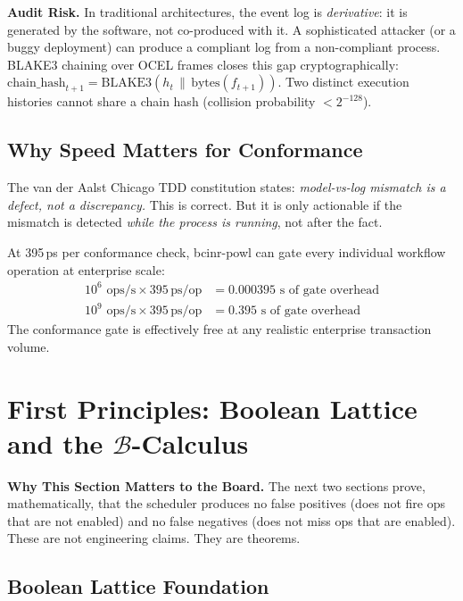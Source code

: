 \documentclass[12pt,a4paper]{article}
\theoremstyle{definition}
\theoremstyle{remark}
\newcommand{\execinsight}[2]{%
  \begin{execbox}
    \textbf{\color{chatblue}#1}\quad #2
  \end{execbox}}
\newcommand{\auditinsight}[2]{%
  \begin{auditbox}
    \textbf{\color{warnorange}#1}\quad #2
  \end{auditbox}}
\begin{document}
\auditinsight{Audit Risk.}{%
In traditional architectures, the event log is \emph{derivative}: it is generated
by the software, not co-produced with it.
A sophisticated attacker (or a buggy deployment) can produce a compliant log
from a non-compliant process.
BLAKE3 chaining over OCEL frames closes this gap cryptographically:
$\mathrm{chain\_hash}_{t+1} = \mathrm{BLAKE3}(h_t \,\|\, \mathrm{bytes}(f_{t+1}))$.
Two distinct execution histories cannot share a chain hash (collision probability $<2^{-128}$).}

\subsection{Why Speed Matters for Conformance}

The van der Aalst Chicago TDD constitution \citep{vanderjest2024chicago} states:
\emph{model-vs-log mismatch is a defect, not a discrepancy.}
This is correct.
But it is only actionable if the mismatch is detected \emph{while the process is running},
not after the fact.

At 395\,ps per conformance check, bcinr-powl can gate every individual workflow operation
at enterprise scale:
\begin{align*}
  10^6 \text{ ops/s} \times 395\,\text{ps/op} &= 0.000395\text{ s of gate overhead} \\
  10^9 \text{ ops/s} \times 395\,\text{ps/op} &= 0.395\text{ s of gate overhead}
\end{align*}
The conformance gate is effectively free at any realistic enterprise transaction volume.

\section{First Principles: Boolean Lattice and the \texorpdfstring{$\mathcal{B}$}{B}-Calculus}
\label{sec:boolean}

\execinsight{Why This Section Matters to the Board.}{%
The next two sections prove, mathematically, that the scheduler produces no false positives
(does not fire ops that are not enabled) and no false negatives (does not miss ops that are
enabled). These are not engineering claims. They are theorems.}

\subsection{Boolean Lattice Foundation}
\end{document}
